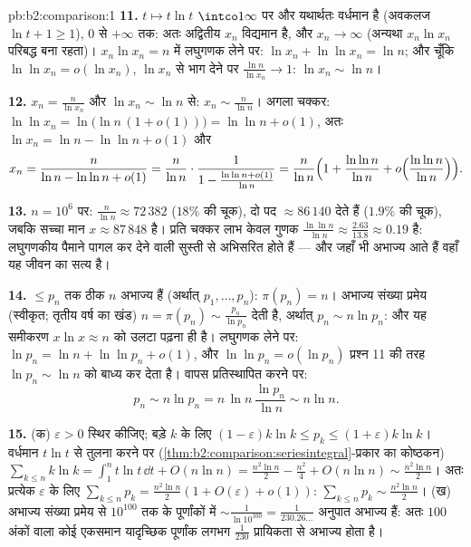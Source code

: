 \begin{solution}{pb:b2:comparison:1}
\textbf{11.} $t \mapsto t\ln t$ $\intco1\infty$ पर  और यथार्थतः वर्धमान है (अवकलज $\ln t + 1 \geq 1$), $0$ से
$+\infty$ तक: अतः अद्वितीय $x_n$ विद्यमान है, और $x_n \to
\infty$ (अन्यथा $x_n\ln x_n$ परिबद्ध बना
रहता)। $x_n\ln x_n = n$ में लघुगणक लेने पर: $\ln x_n + \ln\ln x_n = \ln n$; और चूँकि $\ln\ln x_n = o(\ln x_n)$, $\ln x_n$ से भाग देने पर
$\frac{\ln n}{\ln x_n} \to 1$: $\ln x_n \sim \ln n$।

\textbf{12.} $x_n = \frac{n}{\ln x_n}$ और $\ln x_n \sim
\ln n$ से: $x_n \sim \frac{n}{\ln n}$। अगला चक्कर: $\ln\ln x_n =
\ln\bigl(\ln n\,(1 + o(1))\bigr) = \ln\ln n + o(1)$, अतः $\ln
x_n = \ln n - \ln\ln n + o(1)$ और
\[
x_n = \frac{n}{\ln n - \ln\ln n + o(1)}
= \frac{n}{\ln n}\cdot\frac{1}{1 - \frac{\ln\ln n +
o(1)}{\ln n}}
= \frac{n}{\ln n}\Bigl(1 + \frac{\ln\ln n}{\ln n} +
o\Bigl(\frac{\ln\ln n}{\ln n}\Bigr)\Bigr).
\]

\textbf{13.} $n = 10^6$ पर: $\frac{n}{\ln n} \approx 72\,382$ ($18\%$ की चूक), दो पद $\approx 86\,140$ देते हैं ($1.9\%$ की चूक),
जबकि सच्चा मान $x \approx 87\,848$ है। प्रति चक्कर लाभ केवल गुणक $\frac{\ln\ln n}{\ln n} \approx
\frac{2.63}{13.8} \approx 0.19$ है: लघुगणकीय पैमाने
पागल कर देने वाली सुस्ती से अभिसरित होते हैं --- और जहाँ भी अभाज्य आते
हैं वहाँ यह जीवन का सत्य है।

\textbf{14.} $\leq p_n$ तक ठीक $n$ अभाज्य हैं (अर्थात् $p_1, \dots, p_n$): $\pi(p_n) = n$। अभाज्य संख्या
प्रमेय (स्वीकृत; तृतीय वर्ष का खंड) $n = \pi(p_n) \sim
\frac{p_n}{\ln p_n}$ देती है, अर्थात् $p_n \sim n\ln p_n$: और यह
समीकरण $x\ln x \approx n$ को उलटा पढ़ना ही है। लघुगणक लेने पर: $\ln p_n = \ln n + \ln\ln p_n + o(1)$, और $\ln\ln p_n =
o(\ln p_n)$ प्रश्न 11
की तरह $\ln p_n \sim \ln n$ को बाध्य कर देता है। वापस प्रतिस्थापित करने पर:
\[
p_n \sim n\ln p_n = n\,\ln n\,\frac{\ln p_n}{\ln n} \sim n\ln
n .
\]

\textbf{15.} (क) $\varepsilon > 0$ स्थिर कीजिए; बड़े $k$ के लिए $(1 -
\varepsilon)k\ln k \leq p_k \leq (1 + \varepsilon)k\ln k$। वर्धमान $t\ln t$ से
तुलना करने पर (\cref{thm:b2:comparison:seriesintegral}-प्रकार का कोष्ठकन) $\sum_{k\leq n}k\ln k = \int_1^n t\ln t\,\dd t + O(n\ln n) =
\frac{n^2\ln n}2 - \frac{n^2}4 + O(n\ln n) \sim
\frac{n^2\ln n}2$। अतः प्रत्येक $\varepsilon$ के लिए $\sum_{k\leq n}p_k = \frac{n^2\ln
n}{2}(1 + O(\varepsilon) + o(1))$:
$\sum_{k\leq n}p_k \sim \frac{n^2\ln n}2$। (ख) अभाज्य संख्या प्रमेय से $10^{100}$ तक के पूर्णांकों में $\sim \frac{1}{\ln 10^{100}} = \frac1{230.26\dots}$ अनुपात
अभाज्य हैं: अतः $100$ अंकों वाला कोई एकसमान यादृच्छिक पूर्णांक लगभग $\frac1{230}$
प्रायिकता से अभाज्य होता है।


\end{solution}
